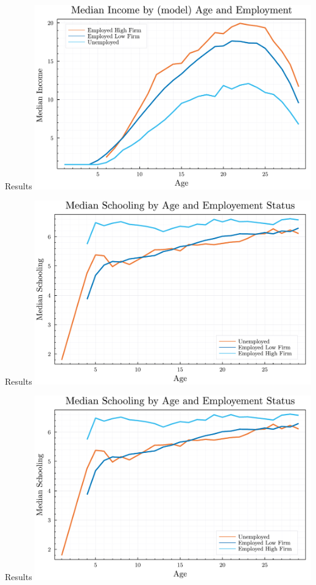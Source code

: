 \documentclass[notes, 10pt]{beamer}
\begin{document}
	\begin{frame}{Results}
        \centering
        \includegraphics[width=12cm]{Figures/fig_median_income_by_age_and_employment_sim_data_v1.pdf}
	\end{frame}
	\begin{frame}{Results}
        \centering
        \includegraphics[width=12cm]{Figures/fig_median_income_by_age_and_employment_sim_data_v2.pdf}
	\end{frame}
    
	\begin{frame}{Results}
        \centering
        \includegraphics[width=12cm]{Figures/fig_median_schooling_by_age_and_employment_sim_data_v2.pdf}
	\end{frame}
\end{document}
